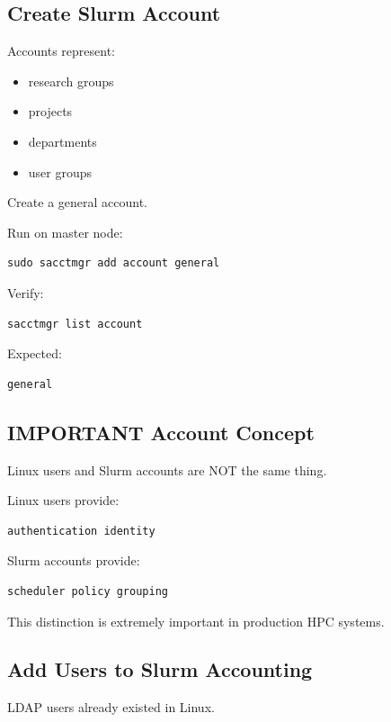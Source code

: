 \documentclass[11pt]{article}
\begin{document}
\subsection{Create Slurm Account}
\label{sec:org1be98ef}

Accounts represent:

\begin{itemize}
\item research groups
\item projects
\item departments
\item user groups
\end{itemize}

Create a general account.

Run on master node:

\begin{verbatim}
sudo sacctmgr add account general
\end{verbatim}

Verify:

\begin{verbatim}
sacctmgr list account
\end{verbatim}

Expected:

\begin{verbatim}
general
\end{verbatim}
\subsection{IMPORTANT Account Concept}
\label{sec:org09168cf}

Linux users and Slurm accounts are NOT the same thing.

Linux users provide:

\begin{verbatim}
authentication identity
\end{verbatim}

Slurm accounts provide:

\begin{verbatim}
scheduler policy grouping
\end{verbatim}

This distinction is extremely important in production HPC systems.
\subsection{Add Users to Slurm Accounting}
\label{sec:org9b6f7da}

LDAP users already existed in Linux.
\end{document}
